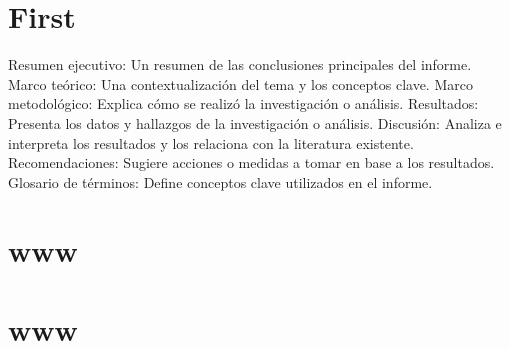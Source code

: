\documentclass[12pt,a4paper]{book}
\begin{document}
\chapter{First}


Resumen ejecutivo: Un resumen de las conclusiones principales del informe. 
Marco teórico: Una contextualización del tema y los conceptos clave. 
Marco metodológico: Explica cómo se realizó la investigación o análisis. 
Resultados: Presenta los datos y hallazgos de la investigación o análisis. 
Discusión: Analiza e interpreta los resultados y los relaciona con la literatura existente. 
Recomendaciones: Sugiere acciones o medidas a tomar en base a los resultados. 
Glosario de términos: Define conceptos clave utilizados en el informe. 




\printindex

\appendix
{}
\setcounter{page}{1}
\chapter{www}
\chapter{www}
\end{document}
